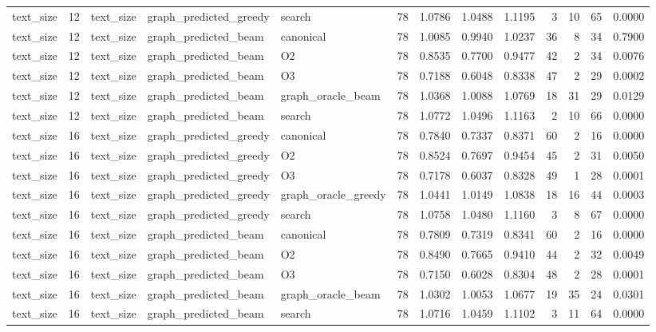 \begin{table}[t]
\begin{tabular}{lrlllrrrrrrrr}
text\_size & 12 & text\_size & graph\_predicted\_greedy & search & 78 & 1.0786 & 1.0488 & 1.1195 & 3 & 10 & 65 & 0.0000 \\
text\_size & 12 & text\_size & graph\_predicted\_beam & canonical & 78 & 1.0085 & 0.9940 & 1.0237 & 36 & 8 & 34 & 0.7900 \\
text\_size & 12 & text\_size & graph\_predicted\_beam & O2 & 78 & 0.8535 & 0.7700 & 0.9477 & 42 & 2 & 34 & 0.0076 \\
text\_size & 12 & text\_size & graph\_predicted\_beam & O3 & 78 & 0.7188 & 0.6048 & 0.8338 & 47 & 2 & 29 & 0.0002 \\
text\_size & 12 & text\_size & graph\_predicted\_beam & graph\_oracle\_beam & 78 & 1.0368 & 1.0088 & 1.0769 & 18 & 31 & 29 & 0.0129 \\
text\_size & 12 & text\_size & graph\_predicted\_beam & search & 78 & 1.0772 & 1.0496 & 1.1163 & 2 & 10 & 66 & 0.0000 \\
text\_size & 16 & text\_size & graph\_predicted\_greedy & canonical & 78 & 0.7840 & 0.7337 & 0.8371 & 60 & 2 & 16 & 0.0000 \\
text\_size & 16 & text\_size & graph\_predicted\_greedy & O2 & 78 & 0.8524 & 0.7697 & 0.9454 & 45 & 2 & 31 & 0.0050 \\
text\_size & 16 & text\_size & graph\_predicted\_greedy & O3 & 78 & 0.7178 & 0.6037 & 0.8328 & 49 & 1 & 28 & 0.0001 \\
text\_size & 16 & text\_size & graph\_predicted\_greedy & graph\_oracle\_greedy & 78 & 1.0441 & 1.0149 & 1.0838 & 18 & 16 & 44 & 0.0003 \\
text\_size & 16 & text\_size & graph\_predicted\_greedy & search & 78 & 1.0758 & 1.0480 & 1.1160 & 3 & 8 & 67 & 0.0000 \\
text\_size & 16 & text\_size & graph\_predicted\_beam & canonical & 78 & 0.7809 & 0.7319 & 0.8341 & 60 & 2 & 16 & 0.0000 \\
text\_size & 16 & text\_size & graph\_predicted\_beam & O2 & 78 & 0.8490 & 0.7665 & 0.9410 & 44 & 2 & 32 & 0.0049 \\
text\_size & 16 & text\_size & graph\_predicted\_beam & O3 & 78 & 0.7150 & 0.6028 & 0.8304 & 48 & 2 & 28 & 0.0001 \\
text\_size & 16 & text\_size & graph\_predicted\_beam & graph\_oracle\_beam & 78 & 1.0302 & 1.0053 & 1.0677 & 19 & 35 & 24 & 0.0301 \\
text\_size & 16 & text\_size & graph\_predicted\_beam & search & 78 & 1.0716 & 1.0459 & 1.1102 & 3 & 11 & 64 & 0.0000 \\

\end{tabular}
\end{table}
